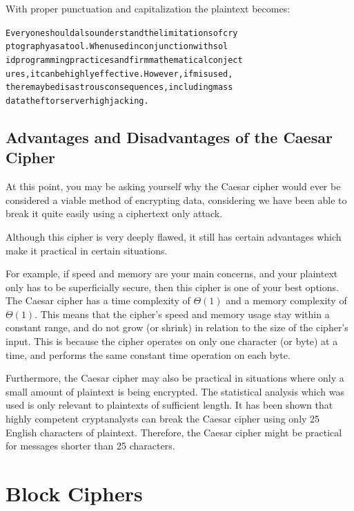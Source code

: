 \documentclass[12pt, a4paper, final]{report}
\begin{document}
With proper punctuation and capitalization the plaintext becomes:

\begin{alltt}
Everyone should also understand the limitations of cry
ptography as a tool. When used in conjunction with sol
id programming practices and firm mathematical conject
ures, it can be highly effective. However, if misused,
there may be disastrous consequences, including mass
data theft or server highjacking.
\end{alltt}

\subsection{Advantages and Disadvantages of the Caesar Cipher}

At this point, you may be asking yourself why the Caesar cipher would
ever be considered a viable method of encrypting data, considering we
have been able to break it quite easily using a ciphertext only attack.

Although this cipher is very deeply flawed, it still has certain
advantages which make it practical in certain situations.

For example, if speed and memory are your main concerns, and your
plaintext only has to be superficially secure, then this cipher is one
of your best options. The Caesar cipher has a time complexity of
$\Theta(1)$ and a memory complexity of $\Theta(1)$.
This means that the cipher's speed and memory usage stay within a constant
range, and do not grow (or shrink) in relation to the size of the cipher's
input. This is because the cipher operates on only one character (or byte)
at a time, and performs the same constant time operation on each byte.

Furthermore, the Caesar cipher may also be practical in situations where
only a small amount of plaintext is being encrypted. The statistical
analysis which was used is only relevant to plaintexts of sufficient
length. It has been shown that highly competent cryptanalysts can break
the Caesar cipher using only 25 English characters of plaintext.
Therefore, the Caesar cipher might be practical for messages shorter than
25 characters.

\section{Block Ciphers}
\end{document}
